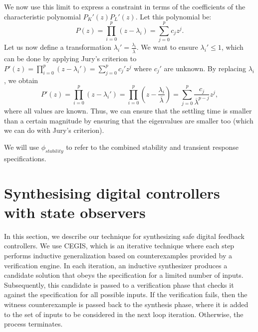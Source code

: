 \documentclass[sigconf]{llncs}
\begin{document}
%
We now use this limit to express a constraint in terms of the
coefficients of the characteristic polynomial $P_K'(z)P_L'(z)$.
Let this polynomial be:
%
\begin{equation}
P(z)=\prod_{i=0}^p (z-\lambda_i)=\sum_{j=0}^p c_jz^j.
\end{equation}
%
Let us now define a
transformation $\lambda_i'=\frac{\lambda_i}{\overline{\lambda}}$.  We want
to ensure $\lambda_i' \leq 1$, which can be done by applying Jury's criterion
to $P'(z)=\prod_{i=0}^p (z-\lambda_i')=\sum_{j=0}^p c_j'z^j$ where $c_j'$ are
unknown.  By replacing $\lambda_i$, we obtain
%
\begin{equation}
P'(z)=\prod_{i=0}^p (z-\lambda_i')=\prod_{i=0}^p \left(z-\frac{\lambda_i}{\overline{\lambda}}\right)=\sum_{j=0}^p \frac{c_j}{\overline{\lambda}^{p-j}}z^j, 
\end{equation}
%
where all values are known.  Thus, we can ensure that the settling time is
smaller than a certain magnitude by ensuring that the eigenvalues are
smaller too (which we can do with Jury's criterion).

We will use $\phi_\mathit{stability}$ to refer to the combined stability and
transient response specifications.

\section{Synthesising digital controllers with state observers}\label{sec:dynamic_synth}


In this section, we describe our technique for synthesizing safe digital
feedback controllers.  We use CEGIS, which is an iterative technique where
each step performs inductive generalization based on counterexamples
provided by a verification engine.  In each iteration, an inductive
synthesizer produces a candidate solution that obeys the specification for a
limited number of inputs.  Subsequently, this candidate is passed to a
verification phase that checks it against the specification for all possible
inputs.  If the verification fails, then the witness counterexample is
passed back to the synthesis phase, where it is added to the set of inputs
to be considered in the next loop iteration.  Otherwise, the process
terminates.
\end{document}
